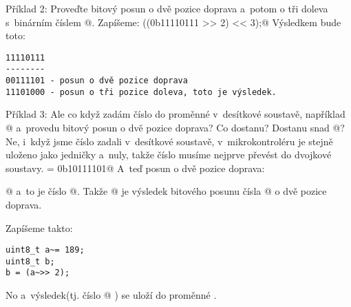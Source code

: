 Příklad 2: Proveďte bitový posun o dvě pozice doprava a~potom o tři doleva s~binárním číslem @. Zapíšeme:
\verb@((0b11110111 >> 2) << 3);@
Výsledkem bude toto:
\begin{verbatim}
11110111
--------
00111101 - posun o dvě pozice doprava
11101000 - posun o tři pozice doleva, toto je výsledek.
\end{verbatim}

Příklad 3: Ale co když zadám číslo do proměnné v~desítkové soustavě, například @ a~provedu bitový posun o dvě pozice doprava? Co dostanu? Dostanu snad @? Ne, i~když jsme číslo zadali v~desítkové soustavě, v~mikrokontroléru je stejně uloženo jako jedničky a~nuly, takže číslo musíme nejprve převést do dvojkové soustavy.
 = 0b10111101@
A~teď posun o dvě pozice doprava:

@ a~to je číslo @.
Takže @ je výsledek bitového posunu čísla @ o dvě pozice doprava.

Zapíšeme takto:
\begin{verbatim}
uint8_t a~= 189;
uint8_t b;
b = (a~>> 2);
\end{verbatim}
No a~výsledek(tj. číslo @ ) se uloží do proměnné \verb@b@.

